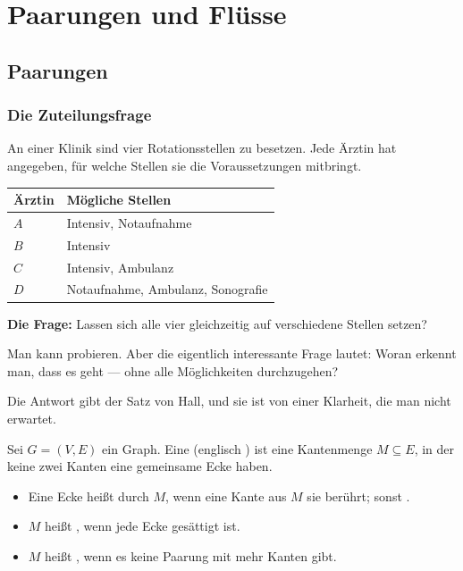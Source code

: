 \part{Paarungen und Flüsse}

\chapter{Paarungen}

\section{Die Zuteilungsfrage}

\begin{merksatz}
An einer Klinik sind vier Rotationsstellen zu besetzen. Jede Ärztin hat angegeben, für welche Stellen sie die Voraussetzungen mitbringt.

\begin{center}
{\small
\renewcommand{\arraystretch}{1.45}
\begin{tabular}{@{}P{2.0cm}P{5.2cm}@{}}
\toprule
\textbf{Ärztin} & \textbf{Mögliche Stellen}\\
\midrule
$A$ & Intensiv, Notaufnahme\\
$B$ & Intensiv\\
$C$ & Intensiv, Ambulanz\\
$D$ & Notaufnahme, Ambulanz, Sonografie\\
\bottomrule
\end{tabular}}
\end{center}

\textbf{Die Frage:} Lassen sich alle vier gleichzeitig auf verschiedene Stellen setzen?
\end{merksatz}

Man kann probieren. Aber die eigentlich interessante Frage lautet: Woran erkennt man, dass es  geht --- ohne alle Möglichkeiten durchzugehen?

Die Antwort gibt der Satz von Hall, und sie ist von einer Klarheit, die man nicht erwartet.

\begin{definition}
Sei $G = (V,E)$ ein Graph. Eine  (englisch ) ist eine Kantenmenge $M \subseteq E$, in der keine zwei Kanten eine gemeinsame Ecke haben.

\begin{itemize}[leftmargin=1.4em, itemsep=3pt]
\item Eine Ecke heißt  durch $M$, wenn eine Kante aus $M$ sie berührt; sonst .
\item $M$ heißt , wenn jede Ecke gesättigt ist.
\item $M$ heißt , wenn es keine Paarung mit mehr Kanten gibt.
\end{itemize}
\end{definition}

